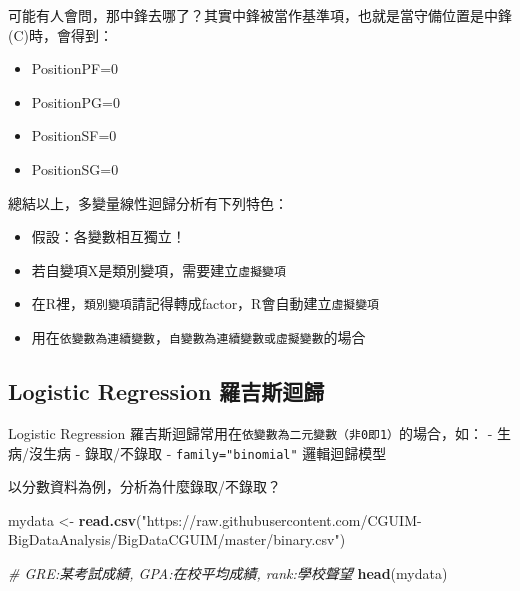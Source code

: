 \documentclass[]{book}
\newenvironment{Shaded}{\begin{snugshade}}{\end{snugshade}}
\newcommand{\CommentTok}[1]{\textcolor[rgb]{0.56,0.35,0.01}{\textit{#1}}}
\newcommand{\KeywordTok}[1]{\textcolor[rgb]{0.13,0.29,0.53}{\textbf{#1}}}
\newcommand{\NormalTok}[1]{#1}
\newcommand{\StringTok}[1]{\textcolor[rgb]{0.31,0.60,0.02}{#1}}
\providecommand{\tightlist}{%
  \setlength{\itemsep}{0pt}\setlength{\parskip}{0pt}}
\begin{document}
可能有人會問，那中鋒去哪了？其實中鋒被當作基準項，也就是當守備位置是中鋒(C)時，會得到：

\begin{itemize}
\tightlist
\item
  PositionPF=0
\item
  PositionPG=0
\item
  PositionSF=0
\item
  PositionSG=0
\end{itemize}

總結以上，多變量線性迴歸分析有下列特色：

\begin{itemize}
\tightlist
\item
  假設：各變數相互獨立！
\item
  若自變項X是類別變項，需要建立\texttt{虛擬變項}
\item
  在R裡，\texttt{類別變項}請記得轉成factor，R會自動建立\texttt{虛擬變項}
\item
  用在\texttt{依變數為連續變數}，\texttt{自變數為連續變數或虛擬變數}的場合
\end{itemize}

\hypertarget{logistic-regression-ux7f85ux5409ux65afux8ff4ux6b78}{%
\subsection{Logistic Regression 羅吉斯迴歸}\label{logistic-regression-ux7f85ux5409ux65afux8ff4ux6b78}}

Logistic Regression 羅吉斯迴歸常用在\texttt{依變數為二元變數（非0即1）}的場合，如：
- 生病/沒生病
- 錄取/不錄取
- \texttt{family="binomial"} 邏輯迴歸模型

以分數資料為例，分析為什麼錄取/不錄取？

\begin{Shaded}
\begin{Highlighting}[]
\NormalTok{mydata <-}\StringTok{ }\KeywordTok{read.csv}\NormalTok{(}\StringTok{"https://raw.githubusercontent.com/CGUIM-BigDataAnalysis/BigDataCGUIM/master/binary.csv"}\NormalTok{)}
\end{Highlighting}
\end{Shaded}

\begin{Shaded}
\begin{Highlighting}[]
\CommentTok{# GRE:某考試成績, GPA:在校平均成績, rank:學校聲望}
\KeywordTok{head}\NormalTok{(mydata)}
\end{Highlighting}
\end{Shaded}
\end{document}
